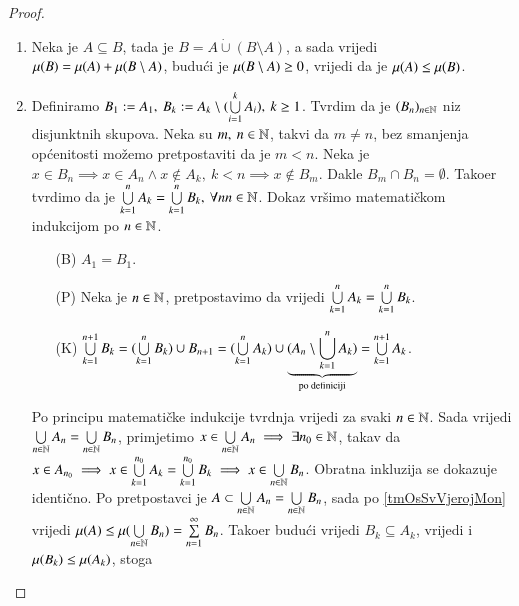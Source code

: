 \begin{proof}
    \begin{enumerate}[label={(\roman*)}]
        \item Neka je $A \subseteq B$, tada je $B = A \dot{\cup} (B \setminus A)$, a sada
            vrijedi $\mu({B}) = \mu({A}) + \mu({B \setminus A})$, budu\' ci je
            $\mu({B \setminus A}) \geq 0$, vrijedi da je $\mu({A}) \leq \mu({B})$.

        \item Definiramo $B_1 := A_1, \: B_k := A_k \setminus (\bigcup\limits_{i=1}^{k} A_i),
            \: k \geq 1$. Tvrdim da je $(B_n)_{n \in \mathbb{N}}$ niz disjunktnih skupova.
            Neka su $m, \: n \in \mathbb{N}$, takvi da $m \neq n$, bez smanjenja op\' cenitosti
            mo\v zemo pretpostaviti da je $m < n$. Neka je $x \in B_n \implies x \in A_n 
            \land x \notin A_k, \: k < n \implies x \notin B_m$.
            Dakle $B_m \cap B_n = \emptyset.$ Tako\dj er tvrdimo da je $\bigcup\limits_{k=1}^{n} A_k
            = \bigcup\limits_{k=1}^{n} B_k, \: \forall n n \in \mathbb{N}$.
            Dokaz vr\v simo matemati\v ckom indukcijom po $n \in \mathbb{N}$.
            \begin{enumerate}
                \item[(B)] $A_1 = B_1$.
                \item[(P)] Neka je $n \in \mathbb{N}$, pretpostavimo da vrijedi $\bigcup\limits_{k=1}^{n} A_k
                = \bigcup\limits_{k=1}^{n} B_k$.
                \item[(K)] $\bigcup\limits_{k=1}^{n+1} B_k = (\bigcup\limits_{k=1}^{n} B_k) \cup B_{n+1}
                    = (\bigcup\limits_{k=1}^{n} A_k) \cup \underbrace{(A_n \setminus
                    \bigcup\limits_{k=1}^{n} A_k)}_{\textnormal{po definiciji}}
                    = \bigcup\limits_{k=1}^{n+1} A_k$.
            \end{enumerate}
            Po principu matemati\v cke indukcije tvrdnja vrijedi za svaki $n \in \mathbb{N}$.
            Sada vrijedi $\bigcup\limits_{n \in \mathbb{N}}^{} A_n = \bigcup\limits_{n \in \mathbb{N}}^{} B_n$, primjetimo
            $x \in \bigcup\limits_{n \in \mathbb{N}}^{} A_n \implies \exists n_0 \in \mathbb{N}$, takav da
            $x \in A_{n_0} \implies x \in \bigcup\limits_{k=1}^{n_0} A_k = \bigcup\limits_{k=1}^{n_0} B_k
            \implies x \in \bigcup\limits_{n \in \mathbb{N}}^{} B_n$. Obratna inkluzija se dokazuje identi\v
            cno.
            Po pretpostavci je $A \subset \bigcup\limits_{n \in \mathbb{N}}^{} A_n = \bigcup\limits_{n \in \mathbb{N}}^{} B_n$,
            sada po \ref{tmOsSvVjerojMon} vrijedi $\mu({A}) \leq
            \mu({\bigcup\limits_{n \in \mathbb{N}}^{} B_n}) = \sum\limits_{n=1}^{\infty} B_n$. Tako\dj er budu\' ci
            vrijedi $B_k \subseteq A_k$, vrijedi i $\mu({B_k}) \leq \mu({A_k})$, stoga

\end{enumerate}
\end{proof}
